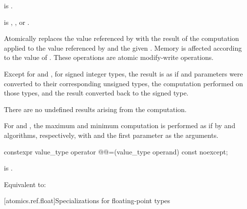 \begin{itemdescr}
\pnum
\constraints
{} is .

\pnum
\expects
{} is ,
, or
.

\pnum
\effects
Atomically replaces the value referenced by 
with the result of the computation applied to
the value referenced by  and the given .
Memory is affected according to the value of .
These operations are atomic modify-write operations.

\pnum
\remarks
Except for  and ,
for signed integer types,
the result is as if  and parameters
were converted to their corresponding unsigned types,
the computation performed on those types, and
the result converted back to the signed type.
\begin{note}
There are no undefined results arising from the computation.
\end{note}
For  and ,
the maximum and minimum computation is performed
as if by  and  algorithms, respectively,
with  and the first parameter as the arguments.
\end{itemdescr}

%
%
%
%
%
\begin{itemdecl}
constexpr value_type operator @@=(value_type operand) const noexcept;
\end{itemdecl}

\begin{itemdescr}
\pnum
\constraints
{} is .

\pnum
\effects
Equivalent to:
\end{itemdescr}

[atomics.ref.float]{Specializations for floating-point types}

